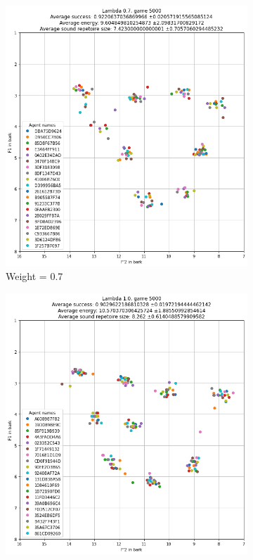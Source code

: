\begin{figure}[ht]
\begin{subfigure}{.30\textwidth}
        \includegraphics[width=\textwidth]{images/extra/bark_weight_5.png}
        \captionsetup{width=0.9\linewidth}
        \captionsetup{justification=centering}
        \caption{Weight = 0.7}
    \end{subfigure}
    \hspace{0.5cm}
    \begin{subfigure}{.30\textwidth}
        \centering
        \includegraphics[width=\textwidth]{images/extra/bark_weight_6.png}

\end{subfigure}
\end{figure}
